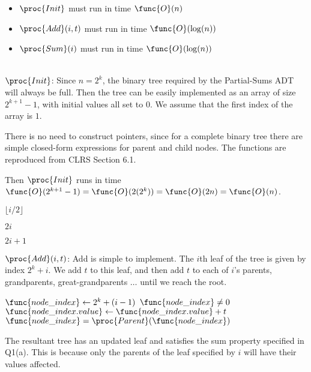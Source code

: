\documentclass[11pt, answers]{exam}
\theoremstyle{plain}
\theoremstyle{definition}
\begin{document}
\begin{questions}
\begin{parts}
\begin{itemize}
\item $\proc{Init}$ must run in time $\func{O}(n)$
\item $\proc{Add}(i,t)$ must run in time $\func{O}(\log(n))$
\item $\proc{Sum}(i)$ must run in time $\func{O}(\log(n))$
\end{itemize}

\begin{solution}\\

$\proc{Init}$:
Since $n = 2^k$, the binary tree required by the Partial-Sums ADT will always be full. Then the tree can be easily implemented as an array of size $2^{k+1} - 1$, with initial values all set to $0$. We assume that the first index of the array is $1$.

There is no need to construct pointers, since for a complete binary tree there are simple closed-form expressions for parent and child nodes. The functions are reproduced from CLRS Section 6.1.

Then $\proc{Init}$ runs in time $\func{O}(2^{k+1} - 1) = \func{O}(2(2^k)) = \func{O}(2n) = \func{O}(n)$.

\begin{codebox}
\li 		\Return $\lfloor i/2 \rfloor$
\end{codebox}

\begin{codebox}
\li 		\Return $2i$
\end{codebox}

\begin{codebox}
\li 		\Return $2i + 1$
\end{codebox}

$\proc{Add}(i,t)$:
Add is simple to implement. The $i$th leaf of the tree is given by index $2^k + i$. We add $t$ to this leaf, and then add $t$ to each of $i$'s parents, grandparents, great-grandparents $\ldots$ until we reach the root.

\begin{codebox}
\li $\func{node\_index} \gets 2^k + (i - 1)$
\li \While $\func{node\_index} \neq 0$
\li \Do $\func{node\_index.value} \gets \func{node\_index.value} + t$
\li $\func{node\_index} = \proc{Parent}(\func{node\_index})$
\End
\end{codebox}

The resultant tree has an updated leaf and satisfies the sum property specified in Q1(a). This is because only the parents of the leaf specified by $i$ will have their values affected.


\end{solution}
\end{parts}
\end{questions}
\end{document}
